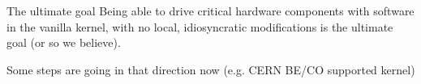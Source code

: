 \documentclass{beamer}
\begin{document}
\begin{frame}{The ultimate goal}
    Being able to drive critical hardware components with software
    in the vanilla kernel, with no local, idiosyncratic modifications
    is the ultimate goal (or so we believe).

    Some steps are going in that direction now (e.g. CERN BE/CO
    supported kernel)
\end{frame}
\end{document}
